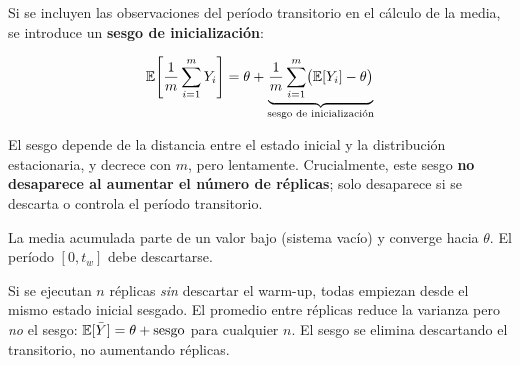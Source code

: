 \documentclass[11pt, letterpaper]{article}
\begin{document}
Si se incluyen las observaciones del período transitorio en el cálculo de la media, se introduce un \textbf{sesgo de inicialización}:

\[
\mathbb{E}\!\left[\frac{1}{m}\sum_{i=1}^m Y_i\right] = \theta + \underbrace{\frac{1}{m}\sum_{i=1}^m\bigl(\mathbb{E}[Y_i] - \theta\bigr)}_{\text{sesgo de inicialización}}
\]

El sesgo depende de la distancia entre el estado inicial y la distribución estacionaria, y decrece con $m$, pero lentamente. Crucialmente, este sesgo \textbf{no desaparece al aumentar el número de réplicas}; solo desaparece si se descarta o controla el período transitorio.

\begin{center}
\end{center}

La media acumulada parte de un valor bajo (sistema vacío) y converge hacia $\theta$. El período $[0, t_w]$ debe descartarse.

\begin{alertabox}
Si se ejecutan $n$ réplicas \emph{sin} descartar el warm-up, todas empiezan desde el mismo estado inicial sesgado. El promedio entre réplicas reduce la varianza pero \emph{no} el sesgo: $\mathbb{E}[\bar Y] = \theta + \text{sesgo}$ para cualquier $n$. El sesgo se elimina descartando el transitorio, no aumentando réplicas.
\end{alertabox}
\end{document}

